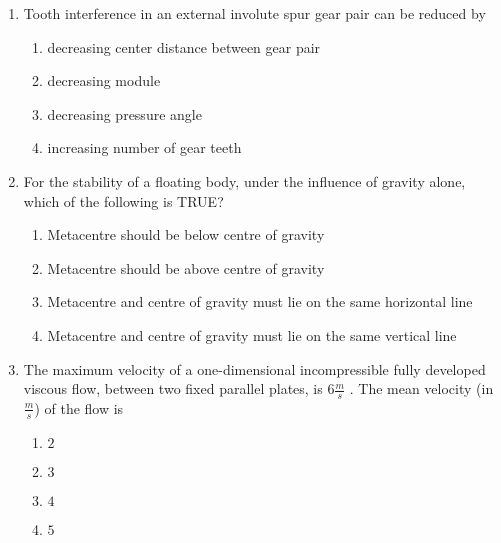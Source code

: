 \documentclass[journal]{IEEEtran}
\begin{document}
\begin{enumerate}
    \item Tooth interference in an external involute spur gear pair can be reduced by

        
            \begin{enumerate}
                \item decreasing center distance between gear pair
                \item decreasing module
                \item decreasing pressure angle
                \item increasing number of gear teeth
            \end{enumerate}
        

    \item For the stability of a floating body, under the influence of gravity alone, which of the following is TRUE?

        
            \begin{enumerate}
                \item Metacentre should be below centre of gravity
                \item Metacentre should be above centre of gravity
                \item Metacentre and centre of gravity must lie on the same horizontal line
                \item Metacentre and centre of gravity must lie on the same vertical line
            \end{enumerate}
        
        
    \item The maximum velocity of a one-dimensional incompressible fully developed viscous flow, between two fixed parallel plates, is $6\frac{m}{s}$ . The mean velocity (in $\frac{m}{s}$) of the flow is

        \begin{multicols}{4}
            \begin{enumerate}
                \item $2$
                \item $3$
                \item $4$
                \item $5$
            \end{enumerate}
        \end{multicols}

\end{enumerate}
\end{document}
